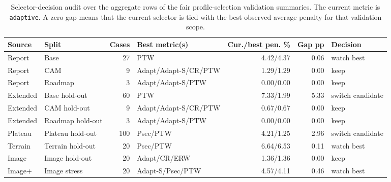 \begin{table}[ht]
\centering
\scriptsize
\setlength{\tabcolsep}{3pt}
\begin{tabular}{@{}llrlrrl@{}}
\toprule
Source & Split & Cases & Best metric(s) & Cur./best pen. \% & Gap pp & Decision \\
\midrule
Report & Base & 27 & PTW & 4.42/4.37 & 0.06 & watch best \\
Report & CAM & 9 & Adapt/Adapt-S/CR/PTW & 1.29/1.29 & 0.00 & keep \\
Report & Roadmap & 3 & Adapt/Adapt-S/PTW & 0.00/0.00 & 0.00 & keep \\
Extended & Base hold-out & 60 & PTW & 7.33/1.99 & 5.33 & switch candidate \\
Extended & CAM hold-out & 9 & Adapt/Adapt-S/CR/PTW & 0.67/0.67 & 0.00 & keep \\
Extended & Roadmap hold-out & 3 & Adapt/Adapt-S/PTW & 0.00/0.00 & 0.00 & keep \\
Plateau & Plateau hold-out & 100 & Psec/PTW & 4.21/1.25 & 2.96 & switch candidate \\
Terrain & Terrain hold-out & 20 & Psec/PTW & 6.64/6.53 & 0.11 & watch best \\
Image & Image hold-out & 20 & Adapt/CR/ERW & 1.36/1.36 & 0.00 & keep \\
Image+ & Image stress & 20 & Adapt-S/Psec/PTW & 4.57/4.11 & 0.46 & watch best \\
\bottomrule
\end{tabular}
\caption{Selector-decision audit over the aggregate rows of the fair
profile-selection validation summaries.  The current metric is
\texttt{adaptive}.  A zero gap means that the current selector is tied with
the best observed average penalty for that validation scope.}
\label{tab:selector-decision-summary}
\end{table}
